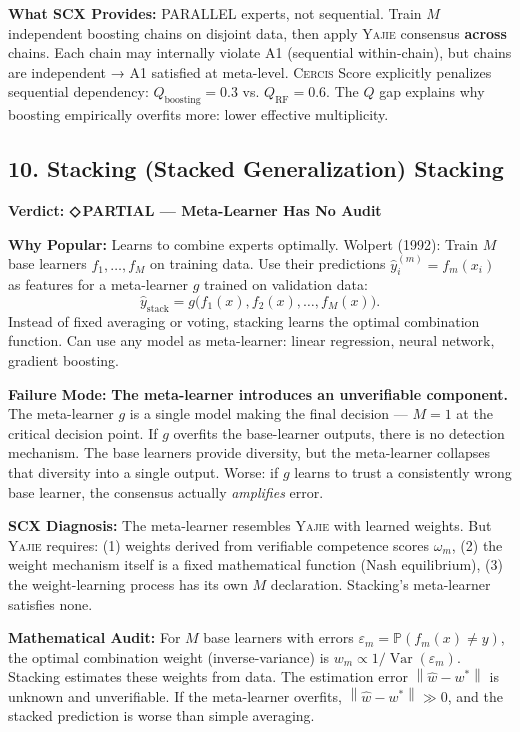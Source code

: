 \documentclass[12pt,a4paper]{article}
\theoremstyle{definition}
\newcommand{\weakness}{{\color{weakcolor}\textbf{◇\,PARTIAL}}}
\newcommand{\Yajie}{\textsc{Yajie}}
\newcommand{\Cercis}{\textsc{Cercis}}
\DeclareMathOperator{\Var}{Var}
\newcommand{\Pbb}{\mathbb{P}}
\newcommand{\norm}[1]{\left\lVert#1\right\rVert}
\newcommand{\auditHeader}[1]{\medskip\noindent\textbf{\large #1}\medskip}
\newcommand{\whyPopular}{\noindent\textbf{Why Popular:} }
\newcommand{\whyFail}{\noindent\textbf{Failure Mode:} }
\newcommand{\whatMissing}{\noindent\textbf{What SCX Provides:} }
\newcommand{\diagnosis}{\noindent\textbf{SCX Diagnosis:} }
\newcommand{\mathAudit}{\noindent\textbf{Mathematical Audit:} }
\begin{document}
\whatMissing{} PARALLEL experts, not sequential. Train $M$ independent boosting chains on disjoint data, then apply \Yajie{} consensus \textbf{across} chains. Each chain may internally violate A1 (sequential within-chain), but chains are independent → A1 satisfied at meta-level. \Cercis{} Score explicitly penalizes sequential dependency: $Q_{\text{boosting}} = 0.3$ vs. $Q_{\text{RF}} = 0.6$. The $Q$ gap explains why boosting empirically overfits more: lower effective multiplicity.

\subsection{10. Stacking (Stacked Generalization) Stacking}

\auditHeader{Verdict: \weakness{} — Meta-Learner Has No Audit}

\whyPopular{} Learns to combine experts optimally. Wolpert (1992): Train $M$ base learners $f_1, \ldots, f_M$ on training data. Use their predictions $\hat{y}_i^{(m)} = f_m(x_i)$ as features for a meta-learner $g$ trained on validation data:
\[
\hat{y}_{\text{stack}} = g\bigl(f_1(x), f_2(x), \ldots, f_M(x)\bigr).
\]
Instead of fixed averaging or voting, stacking learns the optimal combination function. Can use any model as meta-learner: linear regression, neural network, gradient boosting.

\whyFail{} \textbf{The meta-learner introduces an unverifiable component.} The meta-learner $g$ is a single model making the final decision — $M=1$ at the critical decision point. If $g$ overfits the base-learner outputs, there is no detection mechanism. The base learners provide diversity, but the meta-learner collapses that diversity into a single output. Worse: if $g$ learns to trust a consistently wrong base learner, the consensus actually \textit{amplifies} error.

\diagnosis{} The meta-learner resembles \Yajie{} with learned weights. But \Yajie{} requires: (1) weights derived from verifiable competence scores $\omega_m$, (2) the weight mechanism itself is a fixed mathematical function (Nash equilibrium), (3) the weight-learning process has its own $M$ declaration. Stacking's meta-learner satisfies none.

\mathAudit{} For $M$ base learners with errors $\varepsilon_m = \Pbb(f_m(x) \neq y)$, the optimal combination weight (inverse-variance) is $w_m \propto 1/\Var(\varepsilon_m)$. Stacking estimates these weights from data. The estimation error $\norm{\hat{w} - w^*}$ is unknown and unverifiable. If the meta-learner overfits, $\norm{\hat{w} - w^*} \gg 0$, and the stacked prediction is worse than simple averaging.
\end{document}
